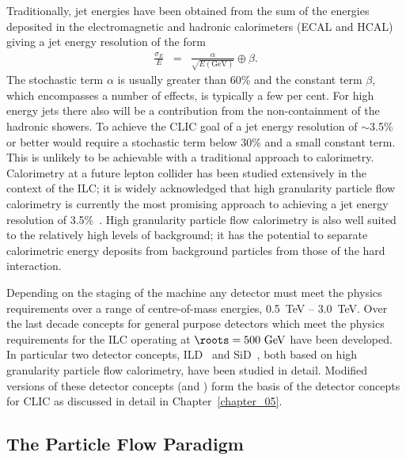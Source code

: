 Traditionally, jet energies have been obtained from the sum of the energies deposited 
in the electromagnetic and hadronic calorimeters (ECAL and HCAL) giving a jet energy 
resolution of the form
\begin{eqnarray*}
  \frac{\sigma_E}{E} &=& \frac{\alpha}{\sqrt{E\mathrm{(GeV)}}} \oplus \beta. \label{eqn:cal} 
\end{eqnarray*}
The stochastic term $\alpha$ is usually greater than 60\% and the
constant term $\beta$, which encompasses a number of effects, is typically
a few per cent. For high energy jets there also will be a contribution 
from the non-containment of the hadronic showers. 
To achieve the CLIC goal of a jet energy resolution of $\sim$3.5\% or better would require
a stochastic term below 30\% and a small constant term. 
This is unlikely to be achievable with a traditional approach to calorimetry. 
Calorimetry at a future lepton collider has been studied extensively in the
context of the ILC; it is widely acknowledged that high granularity particle flow
calorimetry is currently the most promising approach to achieving a jet energy resolution
of 3.5\%~\cite{pfaBrient, pfaMorgunov, thomson:pandora}.
High granularity particle flow calorimetry is also well suited to the relatively
high levels of background; it has the potential to separate calorimetric
energy deposits from background particles from those of the hard interaction.

Depending on the staging of the machine any detector must meet the physics requirements over
a range of centre-of-mass energies, 0.5~TeV -- 3.0~TeV. Over the last decade
concepts for general purpose detectors which meet the physics requirements for the \acs{ILC}
operating at $\roots=500~\mathrm{GeV}$ have been developed. In particular two detector
concepts, \acs{ILD}~\cite{ildloi:2009} and \acs{SiD}~\cite{Aihara:2009ad}, both based on high
granularity particle flow calorimetry, have been studied in detail. Modified versions
of these detector concepts (\clicild and \clicsid) form the basis of the
detector concepts for CLIC as discussed in detail in Chapter~\ref{chapter_05}. 

\subsection{The Particle Flow Paradigm\label{sec:chapter3:concepts:pfa}}

